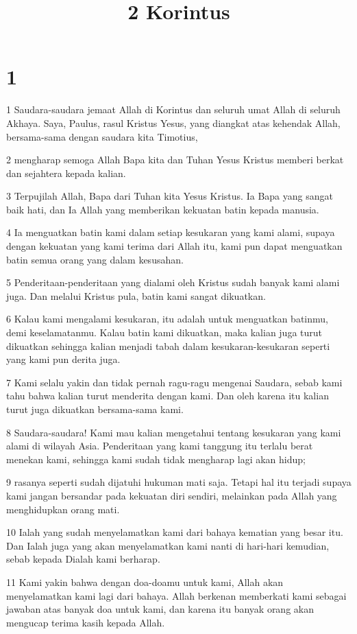 

\title{2 Korintus}


\chapter{1}

\par 1 Saudara-saudara jemaat Allah di Korintus dan seluruh umat Allah di seluruh Akhaya. Saya, Paulus, rasul Kristus Yesus, yang diangkat atas kehendak Allah, bersama-sama dengan saudara kita Timotius,
\par 2 mengharap semoga Allah Bapa kita dan Tuhan Yesus Kristus memberi berkat dan sejahtera kepada kalian.
\par 3 Terpujilah Allah, Bapa dari Tuhan kita Yesus Kristus. Ia Bapa yang sangat baik hati, dan Ia Allah yang memberikan kekuatan batin kepada manusia.
\par 4 Ia menguatkan batin kami dalam setiap kesukaran yang kami alami, supaya dengan kekuatan yang kami terima dari Allah itu, kami pun dapat menguatkan batin semua orang yang dalam kesusahan.
\par 5 Penderitaan-penderitaan yang dialami oleh Kristus sudah banyak kami alami juga. Dan melalui Kristus pula, batin kami sangat dikuatkan.
\par 6 Kalau kami mengalami kesukaran, itu adalah untuk menguatkan batinmu, demi keselamatanmu. Kalau batin kami dikuatkan, maka kalian juga turut dikuatkan sehingga kalian menjadi tabah dalam kesukaran-kesukaran seperti yang kami pun derita juga.
\par 7 Kami selalu yakin dan tidak pernah ragu-ragu mengenai Saudara, sebab kami tahu bahwa kalian turut menderita dengan kami. Dan oleh karena itu kalian turut juga dikuatkan bersama-sama kami.
\par 8 Saudara-saudara! Kami mau kalian mengetahui tentang kesukaran yang kami alami di wilayah Asia. Penderitaan yang kami tanggung itu terlalu berat menekan kami, sehingga kami sudah tidak mengharap lagi akan hidup;
\par 9 rasanya seperti sudah dijatuhi hukuman mati saja. Tetapi hal itu terjadi supaya kami jangan bersandar pada kekuatan diri sendiri, melainkan pada Allah yang menghidupkan orang mati.
\par 10 Ialah yang sudah menyelamatkan kami dari bahaya kematian yang besar itu. Dan Ialah juga yang akan menyelamatkan kami nanti di hari-hari kemudian, sebab kepada Dialah kami berharap.
\par 11 Kami yakin bahwa dengan doa-doamu untuk kami, Allah akan menyelamatkan kami lagi dari bahaya. Allah berkenan memberkati kami sebagai jawaban atas banyak doa untuk kami, dan karena itu banyak orang akan mengucap terima kasih kepada Allah.
